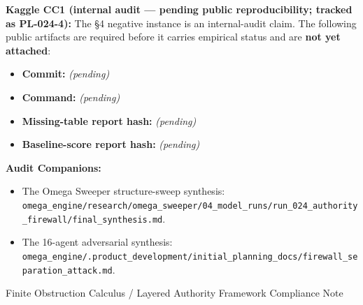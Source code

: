 \documentclass[
  10pt,
]{article}
\providecommand{\tightlist}{%
  \setlength{\itemsep}{0pt}\setlength{\parskip}{0pt}}
\providecommand{\tightlist}{%
  \setlength{\itemsep}{0pt}\setlength{\parskip}{0pt}}
\DeclareRobustCommand{\texttt}[1]{{\paperSymbolFont\nolinkurl{#1}}}
\begin{document}
\textbf{Kaggle CC1 (internal audit --- pending public reproducibility; tracked as PL-024-4):} The §4 negative instance is an internal-audit claim. The following public artifacts are required before it carries empirical status and are \textbf{not yet attached}:

\begin{itemize}
\tightlist
\item
  \textbf{Commit:} \emph{(pending)}
\item
  \textbf{Command:} \emph{(pending)}
\item
  \textbf{Missing-table report hash:} \emph{(pending)}
\item
  \textbf{Baseline-score report hash:} \emph{(pending)}
\end{itemize}

\textbf{Audit Companions:}

\begin{itemize}
\tightlist
\item
  The Omega Sweeper structure-sweep synthesis: \texttt{omega\_engine/research/omega\_sweeper/04\_model\_runs/run\_024\_authority\_firewall/final\_synthesis.md}.
\item
  The 16-agent adversarial synthesis: \texttt{omega\_engine/.product\_development/initial\_planning\_docs/firewall\_separation\_attack.md}.
\end{itemize}

Finite Obstruction Calculus / Layered Authority Framework Compliance Note
\end{document}
